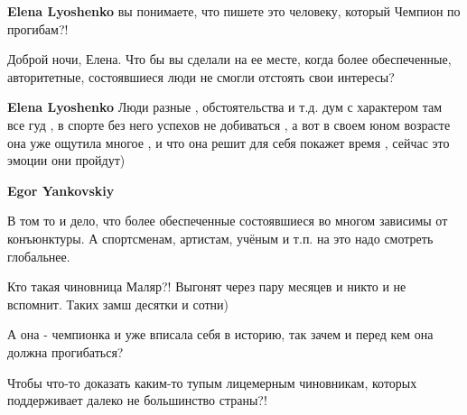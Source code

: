 \begin{itemize}
\begin{itemize}
 
\textbf{Elena Lyoshenko} вы понимаете, что пишете это человеку, который Чемпион по прогибам?!

 

Доброй ночи, Елена. Что бы вы сделали на ее месте, когда более обеспеченные,
авторитетные, состоявшиеся люди не смогли отстоять свои интересы?


 
\textbf{Elena Lyoshenko} Люди разные , обстоятельства и т.д. дум с характером
там все гуд , в спорте без него успехов не добиваться , а вот в своем юном
возрасте она уже ощутила многое , и что она решит для себя покажет время ,
сейчас это эмоции они пройдут)

 

\textbf{Egor Yankovskiy}

В том то и дело, что более обеспеченные состоявшиеся во многом зависимы от
конъюнктуры. А спортсменам, артистам, учёным и т.п. на это надо смотреть
глобальнее.

Кто такая чиновница Маляр?! Выгонят через пару месяцев и никто и не вспомнит.
Таких замш десятки и сотни)

А она - чемпионка и уже вписала себя в историю, так зачем и перед кем она
должна прогибаться?

Чтобы что-то доказать каким-то тупым лицемерным чиновникам, которых
поддерживает далеко не большинство страны?!


 


\end{itemize}
\end{itemize}
